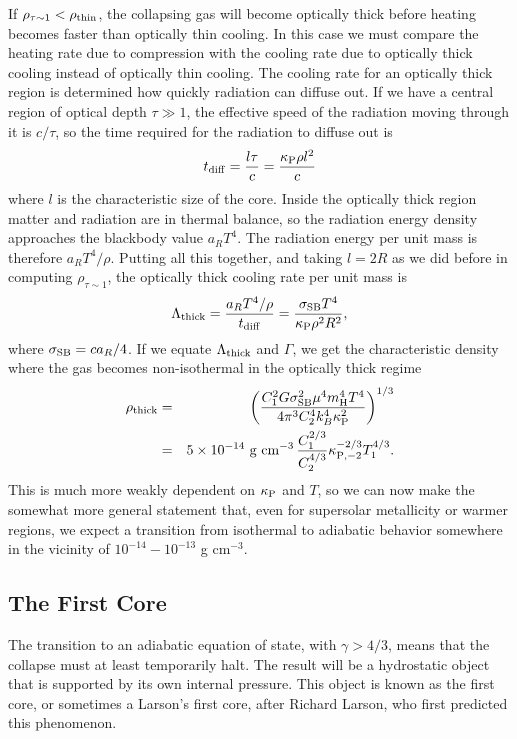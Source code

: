 If $\rho_{\tau\sim 1} < \rho_{\rm thin}$, the collapsing gas will become optically thick before heating becomes faster than optically thin cooling. In this case we must compare the heating rate due to compression with the cooling rate due to optically thick cooling instead of optically thin cooling. The cooling rate for an optically thick region is determined how quickly radiation can diffuse out. If we have a central region of optical depth $\tau\gg 1$, the effective speed of the radiation moving through it is $c/\tau$, so the time required for the radiation to diffuse out is
\begin{equation}
t_{\rm diff} = \frac{l\tau}{c} = \frac{\kappa_{\rm P} \rho l^2}{c}
\end{equation}
where $l$ is the characteristic size of the core. Inside the optically thick region matter and radiation are in thermal balance, so the radiation energy density approaches the blackbody value $a_R T^4$. The radiation energy per unit mass is therefore $a_R T^4/\rho$. Putting all this together, and taking $l=2 R$ as we did before in computing $\rho_{\tau\sim 1}$, the optically thick cooling rate per unit mass is
\begin{equation}
\Lambda_{\rm thick} = \frac{a_R T^4/\rho}{t_{\rm diff}} = \frac{\sigma_{\rm SB} T^4}{\kappa_{\rm P} \rho^2 R^2},
\end{equation}
where $\sigma_{\rm SB} =ca_R /4$. If we equate $\Lambda_{\rm thick}$ and $\Gamma$, we get the characteristic density where the gas becomes non-isothermal in the optically thick regime
\begin{eqnarray}
\rho_{\rm thick} & = & \left(\frac{C_1^2 G \sigma_{\rm SB}^2 \mu^4 m_{\rm H}^4 T^4}{4\pi^3 C_2^4 k_B^4 \kappa_{\rm P}^2}\right)^{1/3} \\
& = & 5\times 10^{-14}\mbox{ g cm}^{-3}\, \frac{C_1^{2/3}}{C_2^{4/3}} \kappa_{\rm P,-2}^{-2/3} T_1^{4/3}.
\end{eqnarray}
This is much more weakly dependent on $\kappa_{\rm P}$ and $T$, so we can now make the somewhat more general statement that, even for supersolar metallicity or warmer regions, we expect a transition from isothermal to adiabatic behavior somewhere in the vicinity of $10^{-14}-10^{-13}$ g cm$^{-3}$.

\subsection{The First Core}

The transition to an adiabatic equation of state, with $\gamma>4/3$, means that the collapse must at least temporarily halt. The result will be a hydrostatic object that is supported by its own internal pressure. This object is known as the first core, or sometimes a Larson's first core, after Richard Larson, who first predicted this phenomenon.

